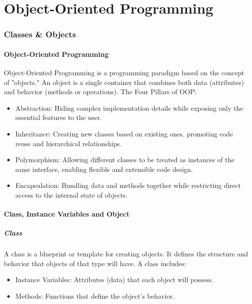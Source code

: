 \documentclass[letterpaper,12pt]{article}
\begin{document}
\part{Object-Oriented Programming}

\section{Classes \& Objects}
\subsection{Object-Oriented Programming}
Object-Oriented Programming is a programming paradigm based on the concept of "objects." An object is a single container that combines both data (attributes) and behavior (methods or operations). The Four Pillars of OOP:
\begin{itemize}
    \item Abstraction: Hiding complex implementation details while exposing only the essential features to the user.
    \item Inheritance: Creating new classes based on existing ones, promoting code reuse and hierarchical relationships.
    \item Polymorphism: Allowing different classes to be treated as instances of the same interface, enabling flexible and extensible code design.
    \item Encapsulation: Bundling data and methods together while restricting direct access to the internal state of objects.
\end{itemize}

\subsection{Class, Instance Variables and Object}
\subsubsection{Class}
A class is a blueprint or template for creating objects. It defines the structure and behavior that objects of that type will have. A class includes:
\begin{itemize}
    \item Instance Variables: Attributes (data) that each object will possess.
    \item Methods: Functions that define the object's behavior.
\end{itemize}
\end{document}
